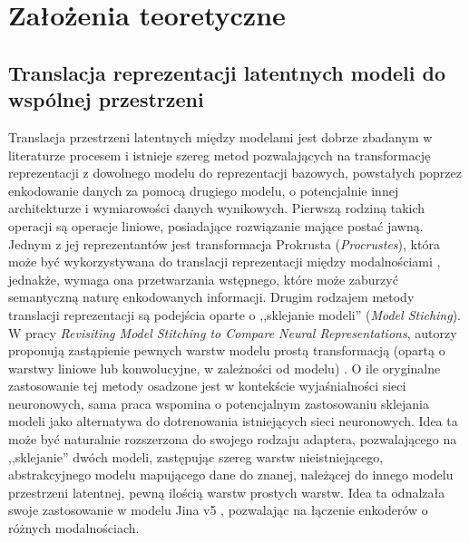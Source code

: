 \section{Założenia teoretyczne}

\subsection{Translacja reprezentacji latentnych modeli do wspólnej przestrzeni}
Translacja przestrzeni latentnych między modelami jest dobrze zbadanym w literaturze procesem i istnieje szereg metod pozwalających na transformację reprezentacji z dowolnego modelu do reprezentacji bazowych, powstałych poprzez enkodowanie danych za pomocą drugiego modelu, o potencjalnie innej architekturze i wymiarowości danych wynikowych. Pierwszą rodziną takich operacji są operacje liniowe, posiadające rozwiązanie mające postać jawną. Jednym z jej reprezentantów jest transformacja Prokrusta (\textit{Procrustes}), która może być wykorzystywana do translacji reprezentacji między modalnościami \cite{latentTranslation}, jednakże, wymaga ona przetwarzania wstępnego, które może zaburzyć semantyczną naturę enkodowanych informacji. Drugim rodzajem metody translacji reprezentacji są podejścia oparte o ,,sklejanie modeli'' (\textit{Model Stiching}). W pracy \textit{Revisiting Model Stitching to Compare Neural Representations}, autorzy proponują zastąpienie pewnych warstw modelu prostą transformacją (opartą o warstwy liniowe lub konwolucyjne, w zależności od modelu) \cite{stiching}. O ile oryginalne zastosowanie tej metody osadzone jest w kontekście wyjaśnialności sieci neuronowych, sama praca wspomina o potencjalnym zastosowaniu sklejania modeli jako alternatywa do dotrenowania istniejących sieci neuronowych. Idea ta może być naturalnie rozszerzona do swojego rodzaju adaptera, pozwalającego na ,,sklejanie'' dwóch modeli, zastępując szereg warstw nieistniejącego, abstrakcyjnego modelu mapującego dane do znanej, należącej do innego modelu przestrzeni latentnej, pewną ilością warstw prostych warstw. Idea ta odnalzała swoje zastosowanie w modelu Jina v5 \cite{Jina5}, pozwalając na łączenie enkoderów o różnych modalnościach.

